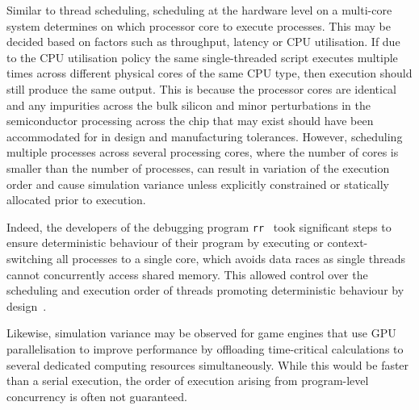 \documentclass[letterpaper, 10 pt, journal, twoside]{IEEEtran}
\begin{document}
Similar to thread scheduling, scheduling at the hardware level on a multi-core system determines on which processor core to execute processes. This may be decided based on factors such as throughput, latency or CPU utilisation. 
%
If due to the CPU utilisation policy the same single-threaded script executes multiple times across different physical cores of the same CPU type,  then execution should still produce the same output. 
%
This is because the processor cores are identical and any impurities across the bulk silicon and minor perturbations in the semiconductor processing across the chip that may exist should have been accommodated for in design and manufacturing tolerances.
%
However, scheduling multiple processes across several processing cores, where the number of cores is smaller than the number of processes, can result in variation of the execution order and cause simulation variance unless explicitly constrained or statically allocated prior to execution. 

Indeed, the developers of the debugging program \texttt{rr}~\cite{RR_link} took significant steps to ensure deterministic behaviour of their program by executing or context-switching all processes to a single core, which avoids data races as single threads cannot concurrently access shared memory. This allowed control over the scheduling and execution order of threads promoting deterministic behaviour by design~\cite{acm-q-rr-interview}.
%

Likewise, simulation variance may be observed for game engines that use GPU parallelisation to improve performance by offloading time-critical calculations to several dedicated computing resources simultaneously. While this would be faster than a serial execution, the order of execution arising from program-level concurrency is often not guaranteed. 
\end{document}

